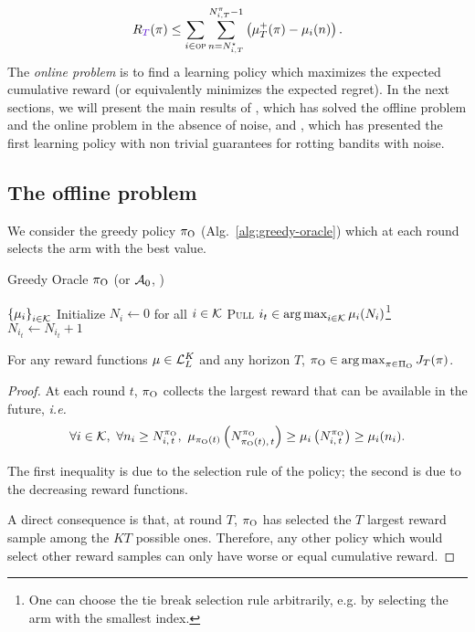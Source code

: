 \begin{equation}
\label{eq:regret-first-bound}
\regret(\pi) \leq \sum_{i\in \overpullSet}   \sum_{n=N_{i,T}^\star}^{N_{i,T}^\pi-1} \pa{\mu^+_T(\pi) - \mu_i(n)}.
\end{equation}
%
The \textit{online problem} is to find a learning policy which maximizes the expected cumulative reward (or equivalently minimizes the expected regret). In the next sections, we will present the main results of \citet{heidari2016tight}, which has solved the offline problem and the online problem in the absence of noise, and \citet{levine2017rotting}, which has presented the first learning policy with non trivial guarantees for rotting bandits with noise. 
%
\subsection{The offline problem \citep{heidari2016tight}}
We consider the greedy policy $\pi_{\rm O}$ (Alg.~\ref{alg:greedy-oracle}) which at each round selects the arm with the best value.

\begin{minipage}{\textwidth}
\renewcommand*\footnoterule{}
\begin{savenotes}
\begin{algorithm}[H]
\caption{Greedy Oracle $\pi_{\rm O}$ (or $\mathcal{A}_{\rm 0}$, \citet{heidari2016tight})}
\label{alg:greedy-oracle}
\begin{algorithmic}[1]
	\Require $\left\{\mu_i\right\}_{i \in \mathcal{K}}$
	\State Initialize $N_i \leftarrow 0$ for all $i \in \mathcal{K}$
		\State \textsc{Pull}  $i_t \in \operatorname*{arg\,max}_{i \in \mathcal{K}} \mu_i(N_{i})$\footnote{One can choose the tie break selection rule arbitrarily, e.g. by selecting the arm with the smallest index.}
		\State $N_{i_t} \leftarrow N_{i_t} + 1$
	\EndFor
\end{algorithmic}
\end{algorithm}
\end{savenotes}
\end{minipage}

\begin{proposition}
For any reward functions $\mu \in \mathcal{L}_L^K$ and any horizon $T$, $\pi_{\rm O} \in \operatorname*{arg\,max}_{\pi \in \Pi_{\rm O}} J_T(\pi)$.
\end{proposition}%
\begin{proof}

At each round $t$, $\pi_{\rm O}$ collects the largest reward that can be available in the future, \textit{i.e.} 
\[
\forall i \in \mathcal{K}, \ \forall n_i \geq N_{i,\,t}^{\pi_{\rm O}}, \ \mu_{\pi_{\rm O}(t)}\left(N_{\pi_{\rm O}(t),\,t}^{\pi_{\rm O}}\right) \geq\mu_{i}\left(N_{i,\,t}^{\pi_{\rm O}}\right)  \geq \mu_i(n_i).
\]

The first inequality is due to the selection rule of the policy; the second is due to the decreasing reward functions. 

A direct consequence is that, at round $T$, $\pi_{\rm O}$ has selected the $T$ largest reward sample among the $KT$ possible ones. Therefore, any other policy which would select other reward samples can only have worse or equal cumulative reward. 
\end{proof}

